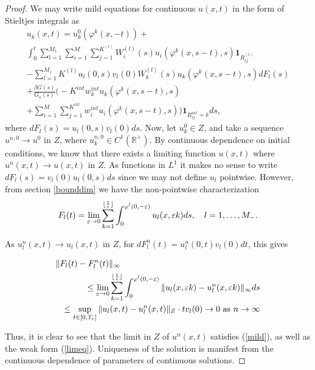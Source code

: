   \begin{proof}
We may write mild equations for continuous $u(x,t)$ in the form of Stieltjes integrals as
 \begin{eqnarray}\label{mild}
u_k(x,t)= u_k^0(\varphi^k(x,-t))+\\ \int_0^t \sum_{l = 1}^{M_1}\sum_{i = 1}^{M}\sum_{j= 1}^{K^{(l)}} W^{(l)}_i(s)u_i(\varphi^k(x,s-t),s)\mathbf{1}_{R^{(l)}_{ij}} \nonumber\\
-\sum_{l = 1}^{M_1}K^{(l)}u_l(0,s)v_{l}(0)W^{(l)}_k(s)u_k(\varphi^k(x,s-t),s)dF_l(s)\nonumber\\+\frac{\beta G(s)}{G_o(s)}\big( -K^{int}w^{int}_ku_{k}(\varphi^k(x,s-t),s)\nonumber
\\+  \sum_{i = 1}^{M}\sum_{j= 1}^{K^{int}} w^{int}_iu_{i}(\varphi^k(x,s-t),s)\big)\mathbf{1}_{R^{int}_{ij} = k}ds, \nonumber \end{eqnarray}
where $dF_l(s) = u_l(0,s)v_l(0)ds$.  Now, let $u_k^{0} \in Z$, and take a sequence $u^{n,0} \rightarrow u^0$ in $Z$, where $u_k^{n,0} \in C^1(\mathbb R^+)$.  By continuous dependence on initial conditions, we know that there exists a limiting function $u(x,t)$ where $u^n(x,t) \rightarrow u(x,t)$ in $Z$. As functions in $L^1$ it makes no sense to write $dF_l(s) = v_l(0)u_l(0,s)ds$ since we may not define $u_l$ pointwise.  However, from section \ref{bounddim} we have the non-pointwise characterization
\begin{equation}
F_l(t)= 
 \lim_{\varepsilon \rightarrow 0}\sum_{k = 1}^{\lfloor \frac t\epsilon \rfloor} \int_0^{\varphi^l(0,-\varepsilon)}u_l(x,\varepsilon k)ds,\\ \quad l = 1, \dots, M_-.
\end{equation}

As $u^n_l(x,t) \rightarrow u_l(x,t)$ in $Z$, for $dF^n_l(t) = u_l^{n}(0,t)v_l(0)dt$, this gives

\begin{eqnarray}
\lefteqn{\|F_l(t)-F^n_l(t)\|_\infty}\\
&&\le \lim_{\varepsilon \rightarrow 0}\sum_{k = 1}^{\lfloor \frac t\epsilon \rfloor} \int_0^{\varphi^l(0,-\varepsilon)}\|u_l(x,\varepsilon k)-u^n_l(x,\varepsilon k)\|_\infty ds \nonumber\\
&& \le \sup_{t\in [0,T_e]}\|u_l(x,t)-u^n_l(x,t)\|_Z\cdot tv_l(0) \rightarrow 0 \hbox{ as } n \rightarrow \infty \nonumber
\end{eqnarray}

Thus, it is clear to see that the limit in $Z$ of $u^n(x,t)$ satisfies (\ref{mild}), as well as the weak form (\ref{limeq}).  Uniqueness of the solution is manifest from the continuous dependence of parameters of continuous solutions. \end{proof}
